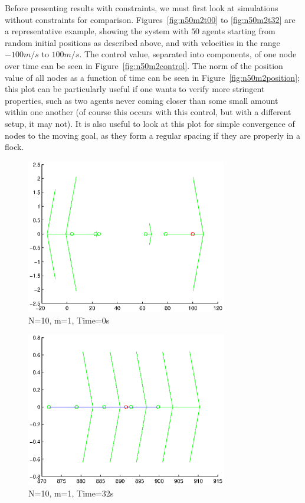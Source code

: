 \documentclass[10pt, conference]{IEEEtran}
\begin{document}
Before presenting results with constraints, we must first look at simulations without constraints for comparison.  Figures~\ref{fig:n50m2t00} to \ref{fig:n50m2t32} are a representative example, showing the system with $50$ agents starting from random initial positions as described above, and with velocities in the range $-100m/s$ to $100m/s$.
%
The control value, separated into components, of one node over time can be seen in Figure~\ref{fig:n50m2control}.
%
The norm of the position value of all nodes as a function of time can be seen in Figure~\ref{fig:n50m2position}; this plot can be particularly useful if one wants to verify more stringent properties, such as two agents never coming closer than some small amount within one another (of course this occurs with this control, but with a different setup, it may not).
%
It is also useful to look at this plot for simple convergence of nodes to the moving goal, as they form a regular spacing if they are properly in a flock.

\begin{figure}[!h]
  \begin{center}
    \includegraphics[width=3.45in]{simOneDt00}
  \end{center}

  \caption{\small N=10, m=1, Time=0s}
  \label{fig:simOneDt00}
\end{figure}

\begin{figure}[!p]
  \begin{center}
    \includegraphics[width=3.45in]{simOneDt32}
  \end{center}

  \caption{\small N=10, m=1, Time=32s}
  \label{fig:simOneDt32}
\end{figure}
\end{document}
